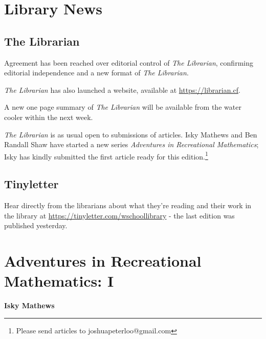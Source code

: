 \documentclass[1opt,a4paper]{article}
\begin{document}


\section{Library News}
\begin{multicols}{2}
\subsection{The Librarian}
Agreement has been reached over editorial control of \textit{The Librarian}, confirming editorial independence and a new format of \textit{The Librarian}.

\textit{The Librarian} has also launched a website, available at \url{https://librarian.cf}.

A new one page summary of \textit{The Librarian} will be available from the water cooler within the next week.

\textit{The Librarian} is as usual open to submissions of articles. Isky Mathews and Ben Randall Shaw have started a new series \textit{Adventures in Recreational Mathematics}; Isky has kindly submitted the first article ready for this edition.\footnote{Please send articles to joshuapeterloo@gmail.com}

\subsection{Tinyletter}
Hear directly from the librarians about what they're reading and their work in the library at \url{https://tinyletter.com/wschoollibrary} - the last edition was published yesterday.

\end{multicols}

\section{Adventures in Recreational Mathematics: I}
\textbf{Isky Mathews}
\end{document}
